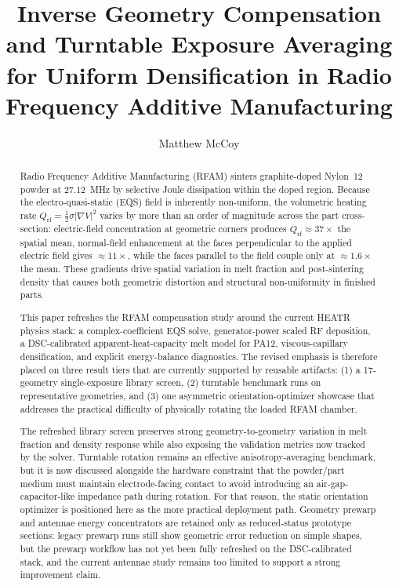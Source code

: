 \documentclass[5p,times]{elsarticle}
\newcommand{\Qrf}{Q_{\mathrm{rf}}}
\newcommand{\half}{\tfrac{1}{2}}
\begin{document}
\begin{frontmatter}

\title{Inverse Geometry Compensation and Turntable Exposure
Averaging for Uniform Densification in Radio Frequency Additive
Manufacturing}

\author[gatech]{Matthew McCoy}
\address[gatech]{School of Mechanical Engineering, Georgia Institute of
Technology, Atlanta, Georgia 30332, USA}

\begin{abstract}
Radio Frequency Additive Manufacturing (RFAM) sinters graphite-doped
Nylon~12 powder at \SI{27.12}{\mega\hertz} by selective Joule
dissipation within the doped region.  Because the electro-quasi-static
(EQS) field is inherently non-uniform, the volumetric heating rate
$\Qrf = \half\sigma|\nabla V|^{2}$ varies by more than an order of
magnitude across the part cross-section: electric-field concentration
at geometric corners produces $\Qrf \approx 37\times$ the spatial
mean, normal-field enhancement at the faces perpendicular to the applied
electric field gives $\approx 11\times$, while the faces parallel to
the field couple only at $\approx 1.6\times$ the mean.  These gradients
drive spatial variation in melt fraction and post-sintering density that
causes both geometric distortion and structural non-uniformity in
finished parts.

This paper refreshes the RFAM compensation study around the current
HEATR physics stack: a complex-coefficient EQS solve, generator-power
scaled RF deposition, a DSC-calibrated apparent-heat-capacity melt
model for PA12, viscous-capillary densification, and explicit
energy-balance diagnostics.  The revised emphasis is therefore placed
on three result tiers that are currently supported by reusable
artifacts: (1) a 17-geometry single-exposure library screen,
(2) turntable benchmark runs on representative geometries, and
(3) one asymmetric orientation-optimizer showcase that addresses the
practical difficulty of physically rotating the loaded RFAM chamber.

The refreshed library screen preserves strong geometry-to-geometry
variation in melt fraction and density response while also exposing the
validation metrics now tracked by the solver.  Turntable rotation
remains an effective anisotropy-averaging benchmark, but it is now
discussed alongside the hardware constraint that the powder/part medium
must maintain electrode-facing contact to avoid introducing an
air-gap-capacitor-like impedance path during rotation.  For that
reason, the static orientation optimizer is positioned here as the more
practical deployment path.  Geometry prewarp and antennae energy
concentrators are retained only as reduced-status prototype sections:
legacy prewarp runs still show geometric error reduction on simple
shapes, but the prewarp workflow has not yet been fully refreshed on
the DSC-calibrated stack, and the current antennae study remains too
limited to support a strong improvement claim.
\end{abstract}


\end{frontmatter}
\end{document}
